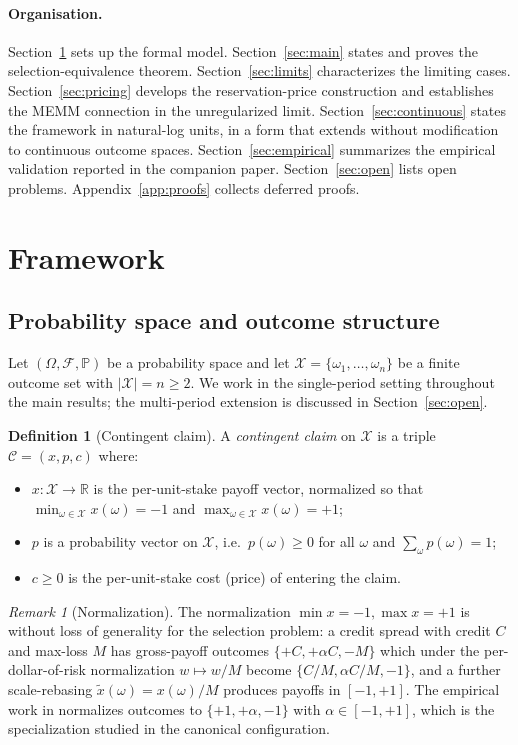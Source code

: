 \documentclass[11pt]{article}
\theoremstyle{definition}
\newtheorem{definition}[theorem]{Definition}
\theoremstyle{remark}
\newtheorem{remark}[theorem]{Remark}
\newcommand{\PP}{\mathbb{P}}
\newcommand{\R}{\mathbb{R}}
\newcommand{\C}{\mathcal{C}}
\newcommand{\F}{\mathcal{F}}
\newcommand{\X}{\mathcal{X}}
\begin{document}
\paragraph{Organisation.}
Section~\ref{sec:framework} sets up the formal model.
Section~\ref{sec:main} states and proves the selection-equivalence
theorem. Section~\ref{sec:limits} characterizes the limiting cases.
Section~\ref{sec:pricing} develops the reservation-price construction
and establishes the MEMM connection in the unregularized limit.
Section~\ref{sec:continuous} states the framework in natural-log
units, in a form that extends without modification to continuous
outcome spaces. Section~\ref{sec:empirical} summarizes the
empirical validation reported in the companion paper.
Section~\ref{sec:open} lists open problems. Appendix~\ref{app:proofs}
collects deferred proofs.


\section{Framework}\label{sec:framework}

\subsection{Probability space and outcome structure}

Let $(\Omega, \F, \PP)$ be a probability space and let
$\X = \{\omega_1, \ldots, \omega_n\}$ be a finite outcome set with
$|\X| = n \ge 2$. We work in the single-period setting throughout the
main results; the multi-period extension is discussed in
Section~\ref{sec:open}.

\begin{definition}[Contingent claim]\label{def:claim}
A \emph{contingent claim} on $\X$ is a triple
$\C = (x, p, c)$ where:
\begin{itemize}
    \item $x: \X \to \R$ is the per-unit-stake payoff vector,
          normalized so that $\min_{\omega \in \X} x(\omega) = -1$ and
          $\max_{\omega \in \X} x(\omega) = +1$;
    \item $p$ is a probability vector on $\X$, i.e.\ $p(\omega) \ge 0$
          for all $\omega$ and $\sum_\omega p(\omega) = 1$;
    \item $c \ge 0$ is the per-unit-stake cost (price) of entering the
          claim.
\end{itemize}
\end{definition}

\begin{remark}[Normalization]\label{rem:normalize}
The normalization $\min x = -1, \max x = +1$ is without loss of
generality for the selection problem: a credit spread with credit $C$
and max-loss $M$ has gross-payoff outcomes $\{+C, +\alpha C, -M\}$ which
under the per-dollar-of-risk normalization $w \mapsto w/M$ become
$\{C/M, \alpha C/M, -1\}$, and a further scale-rebasing
$\tilde x(\omega) = x(\omega) / M$ produces payoffs in $[-1, +1]$. The
empirical work in \citet{mercurio2026empirical} normalizes outcomes to
$\{+1, +\alpha, -1\}$ with $\alpha \in [-1, +1]$, which is the
specialization studied in the canonical configuration.
\end{remark}
\end{document}
